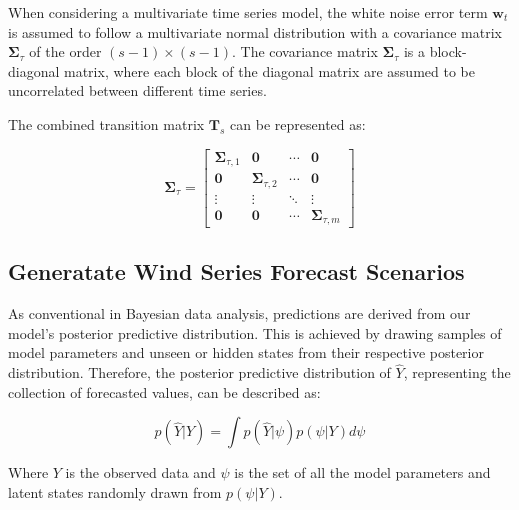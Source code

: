     When considering a multivariate time series model, the white noise error term $\bm{w}_{t}$ is assumed to follow
    a multivariate normal distribution with a covariance matrix $\bm{\Sigma}_{\tau}$ of the order $(s-1) \times (s-1)$.
    The covariance matrix $\bm{\Sigma}_{\tau}$ is a block-diagonal matrix, where each block of the diagonal matrix are
    assumed to be uncorrelated between different time series.

    The combined transition matrix $\mathbf{T}_{s}$ can be represented as:

    \begin{equation}
        \bm{\Sigma}_{\tau} =
            \left[
                \begin{array}{cccc}
                    \mathbf{\Sigma}_{\tau, 1} & \mathbf{0}                 & \cdots & \mathbf{0} \\
                    \mathbf{0}                & \mathbf{\Sigma}_{\tau, 2}  & \cdots & \mathbf{0} \\
                    \vdots                    & \vdots                     & \ddots & \vdots     \\
                    \mathbf{0}                & \mathbf{0}                 & \cdots & \mathbf{\Sigma}_{\tau, m}
                \end{array}
            \right]
    \label{eq:seasonal_covariance}
    \end{equation}

\subsection{Generatate Wind Series Forecast Scenarios}
    \label{sec:wind_forecast_scenarios}

    As conventional in Bayesian data analysis, predictions are derived from our model's posterior predictive distribution.
    This is achieved by drawing samples of model parameters and unseen or hidden states from their respective posterior distribution.
    Therefore, the posterior predictive distribution of $\hat{Y}$, representing the collection of forecasted values, can be described as:

    \begin{equation}
        p(\hat{Y} | Y) = \int p(\hat{Y} | \psi) p(\psi | Y) d\psi
    \label{eq:posterior_predictive}
    \end{equation}

    Where $Y$ is the observed data and $\psi$ is the set of all the model parameters and latent states randomly drawn from
    $p(\psi | Y)$.

